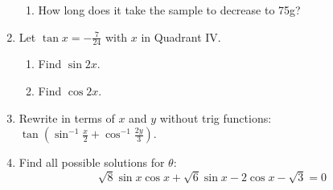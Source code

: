 \documentclass[letterpaper,12pt,fleqn]{article}
\begin{document}
\begin{enumerate}
\begin{enumerate}
\item How long does it take the sample to decrease to 75g?

\end{enumerate}

\item Let $\tan x=-\frac{7}{24}$ with $x$ in Quadrant IV.
\begin{enumerate}
\item Find $\sin2x$.

\item Find $\cos2x$.
\end{enumerate}

\item Rewrite in terms of $x$ and $y$ without trig functions:
$\tan(\sin^{-1}\frac{x}{2}+\cos^{-1}\frac{2y}{3})$.

\item Find all possible solutions for $\theta$:
\[\sqrt{8}\sin{x}\cos{x}+\sqrt{6}\sin{x}-2\cos{x}-\sqrt{3}=0\]

\end{enumerate}
\end{document}
